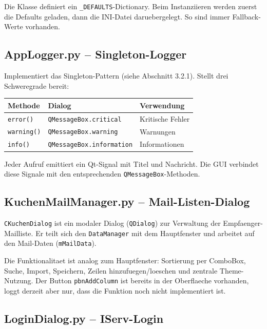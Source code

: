 \documentclass[12pt, a4paper]{article}
\begin{document}
\begin{infobox}
Die Klasse definiert ein \texttt{\_DEFAULTS}-Dictionary. Beim Instanziieren
werden zuerst die Defaults geladen, dann die INI-Datei daruebergelegt. So
sind immer Fallback-Werte vorhanden.
\end{infobox}


\subsection{AppLogger.py -- Singleton-Logger}

Implementiert das Singleton-Pattern (siehe Abschnitt 3.2.1). Stellt drei
Schweregrade bereit:

\begin{table}[ht!]
\centering
{}
\begin{tabularx}{0.85\textwidth}{llX}
\toprule
\textbf{Methode} & \textbf{Dialog} & \textbf{Verwendung} \\
\midrule
\texttt{error()} & \texttt{QMessageBox.critical} & Kritische Fehler \\
\texttt{warning()} & \texttt{QMessageBox.warning} & Warnungen \\
\texttt{info()} & \texttt{QMessageBox.information} & Informationen \\
\bottomrule
\end{tabularx}
\end{table}

Jeder Aufruf emittiert ein Qt-Signal mit Titel und Nachricht. Die GUI
verbindet diese Signale mit den entsprechenden \texttt{QMessageBox}-Methoden.


\subsection{KuchenMailManager.py -- Mail-Listen-Dialog}

\texttt{CKuchenDialog} ist ein modaler Dialog (\texttt{QDialog}) zur Verwaltung
der Empfaenger-Mailliste. Er teilt sich den \texttt{DataManager} mit dem
Hauptfenster und arbeitet auf den Mail-Daten (\texttt{mMailData}).

Die Funktionalitaet ist analog zum Hauptfenster: Sortierung per ComboBox,
Suche, Import, Speichern, Zeilen hinzufuegen/loeschen und zentrale Theme-Nutzung.
Der Button \texttt{pbnAddColumn} ist bereits in der Oberflaeche vorhanden,
loggt derzeit aber nur, dass die Funktion noch nicht implementiert ist.


\subsection{LoginDialog.py -- IServ-Login}
\end{document}

